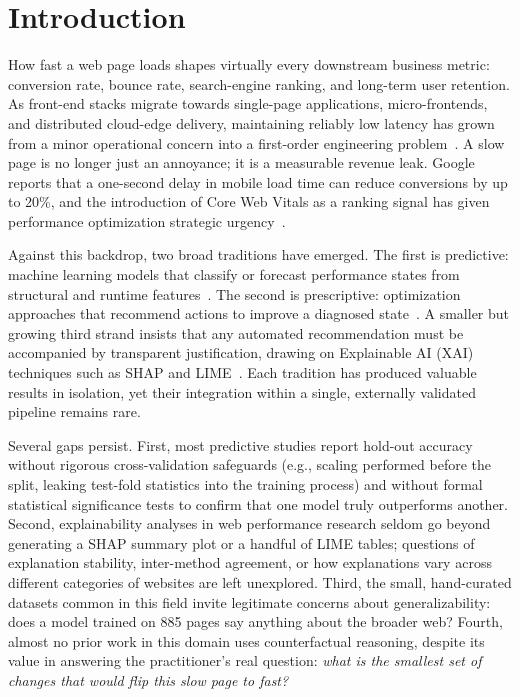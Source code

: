 \documentclass[sn-nature]{sn-jnl}
\begin{document}


\maketitle


\section{Introduction}\label{sec1}

How fast a web page loads shapes virtually every downstream business metric: conversion rate, bounce rate, search-engine ranking, and long-term user retention. As front-end stacks migrate towards single-page applications, micro-frontends, and distributed cloud-edge delivery, maintaining reliably low latency has grown from a minor operational concern into a first-order engineering problem~\cite{kaushik2024, xin2023}. A slow page is no longer just an annoyance; it is a measurable revenue leak. Google reports that a one-second delay in mobile load time can reduce conversions by up to 20\%, and the introduction of Core Web Vitals as a ranking signal has given performance optimization strategic urgency~\cite{mathur2024, vanriet2023}.

Against this backdrop, two broad traditions have emerged. The first is predictive: machine learning models that classify or forecast performance states from structural and runtime features~\cite{ghattas2025, mathur2024, sehwag2024, huang2023}. The second is prescriptive: optimization approaches that recommend actions to improve a diagnosed state~\cite{notz2024, surianarayanan2023, goscien2025, asha2025}. A smaller but growing third strand insists that any automated recommendation must be accompanied by transparent justification, drawing on Explainable AI (XAI) techniques such as SHAP and LIME~\cite{salih2024, hassija2024, ortigossa2024}. Each tradition has produced valuable results in isolation, yet their integration within a single, externally validated pipeline remains rare.

Several gaps persist. First, most predictive studies report hold-out accuracy without rigorous cross-validation safeguards (e.g., scaling performed before the split, leaking test-fold statistics into the training process) and without formal statistical significance tests to confirm that one model truly outperforms another. Second, explainability analyses in web performance research seldom go beyond generating a SHAP summary plot or a handful of LIME tables; questions of explanation stability, inter-method agreement, or how explanations vary across different categories of websites are left unexplored. Third, the small, hand-curated datasets common in this field invite legitimate concerns about generalizability: does a model trained on 885 pages say anything about the broader web? Fourth, almost no prior work in this domain uses counterfactual reasoning, despite its value in answering the practitioner's real question: \textit{what is the smallest set of changes that would flip this slow page to fast?}
\end{document}
